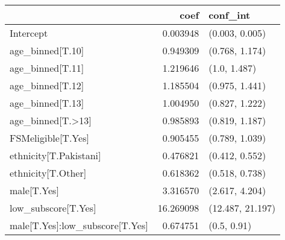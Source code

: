 \begin{tabular}{lrl}
\toprule
{} &       coef &          conf\_int \\
\midrule
Intercept                       &   0.003948 &    (0.003, 0.005) \\
age\_binned[T.10]                &   0.949309 &    (0.768, 1.174) \\
age\_binned[T.11]                &   1.219646 &      (1.0, 1.487) \\
age\_binned[T.12]                &   1.185504 &    (0.975, 1.441) \\
age\_binned[T.13]                &   1.004950 &    (0.827, 1.222) \\
age\_binned[T.>13]               &   0.985893 &    (0.819, 1.187) \\
FSMeligible[T.Yes]              &   0.905455 &    (0.789, 1.039) \\
ethnicity[T.Pakistani]          &   0.476821 &    (0.412, 0.552) \\
ethnicity[T.Other]              &   0.618362 &    (0.518, 0.738) \\
male[T.Yes]                     &   3.316570 &    (2.617, 4.204) \\
low\_subscore[T.Yes]             &  16.269098 &  (12.487, 21.197) \\
male[T.Yes]:low\_subscore[T.Yes] &   0.674751 &       (0.5, 0.91) \\
\bottomrule
\end{tabular}
